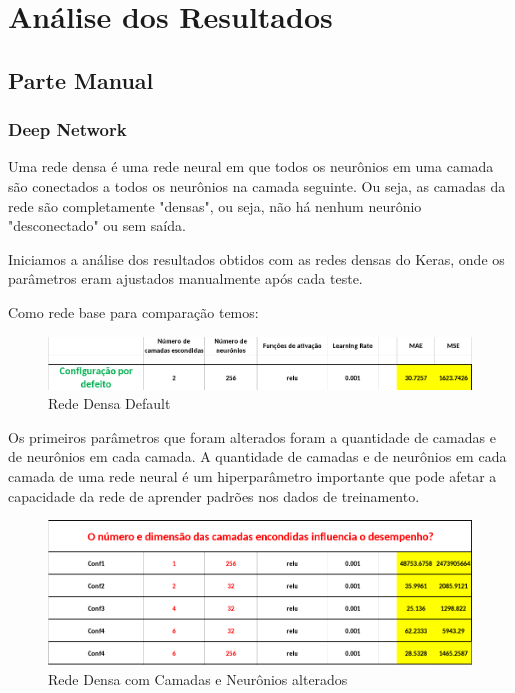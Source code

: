 \documentclass[10pt]{article}
\begin{document}
\section{Análise dos Resultados}\label{sec:anal-res}
\subsection{Parte Manual}
\subsubsection{Deep Network}
Uma rede densa é uma rede neural em que todos os neurônios em uma camada são 
conectados a todos os neurônios na camada seguinte. Ou seja, as camadas da 
rede são completamente "densas", ou seja, não há nenhum neurônio 
"desconectado" ou sem saída.

Iniciamos a análise dos resultados obtidos com as redes densas do Keras, 
onde os parâmetros eram ajustados manualmente após cada teste.

Como rede base para comparação temos:

\begin{figure}[htb]
  \centering
  \includegraphics[width=\linewidth]{img/deep_default.png}
  \caption{Rede Densa Default}
  \label{fig:deep_default}
\end{figure}

\newpage
Os primeiros parâmetros que foram alterados foram a quantidade de 
camadas e de neurônios em cada camada.
A quantidade de camadas e de neurônios em cada camada de uma rede neural é 
um hiperparâmetro importante que pode afetar a capacidade da rede de aprender 
padrões nos dados de treinamento.

\begin{figure}[htb]
  \centering
  \includegraphics[width=\linewidth]{img/deep_camadas_neuronios.png}
  \caption{Rede Densa com Camadas e Neurônios alterados}
  \label{fig:deep_camadas_neuronios}
\end{figure}
\end{document}
